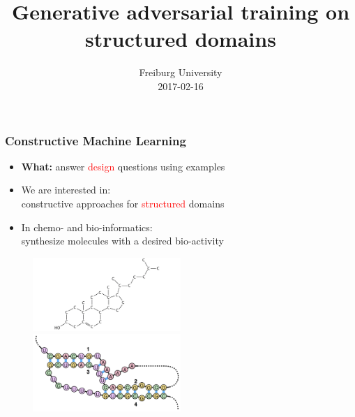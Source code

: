 \documentclass{beamer}
\title 
{Generative adversarial training on \\ structured domains}
\author %
{\underline{Stefan Mautner} \and Fabrizio Costa 
    \small{ 
        \texttt{
            \href{mailto:mautner@informatik.uni-freiburg.de}
            {mautner@informatik.uni-freiburg.de}
        }
        \texttt{
            \href{mailto:f.costa@exeter.ac.uk}
            {f.costa@exeter.ac.uk}
        }
   }
}
\date 
{Freiburg University \\2017-02-16}
\newcommand{\red}[1]{\textcolor{red}{#1}}
\begin{document}
\frame{\titlepage}



\begin{frame}
\frametitle{Constructive Machine Learning}

    \begin{itemize}
        \item {\bf What:} answer \red{design} questions using examples
        \item We are interested in: \\
        constructive approaches for \red{structured} domains
        \item In chemo- and bio-informatics: \\
        synthesize molecules with a desired bio-activity
    \end{itemize}
    \begin{figure}
        \centering
        \includegraphics[width=0.5\textwidth]{images/mol.jpg}
        \includegraphics[width=0.5\textwidth]{images/rna.png}
    \end{figure}    
\end{frame}




\end{document}
